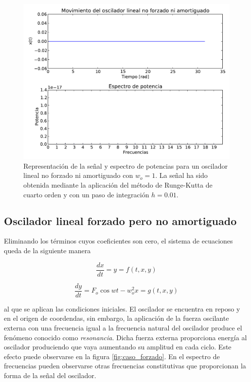 \documentclass[11pt]{article}
\begin{document}
\begin{figure}[h]
\centering
\includegraphics[width=0.75\linewidth]{caso_lineal.pdf}
\caption{Representación de la señal y espectro de potencias para un oscilador lineal no forzado ni amortiguado con $w_o = 1$. La señal ha sido obtenida mediante la aplicación del método de Runge-Kutta de cuarto orden y con un paso de integración $h = 0.01$.}
\label{fig:caso_lineal}
\end{figure}

\subsection{Oscilador lineal forzado pero no amortiguado}
Eliminando los términos cuyos coeficientes son cero, el sistema de ecuaciones queda de la siguiente manera

\begin{equation}
	\frac{dx}{dt} = y = f(t, x, y)
\end{equation}

\begin{equation}
	\frac{dy}{dt} = F_o\cos{wt} - w_o^2 x = g(t, x, y) 	
\end{equation}

al que se aplican las condiciones iniciales. El oscilador se encuentra en reposo y en el origen de coordendas, sin embargo, la aplicación de la fuerza oscilante externa con una frecuencia igual a la frecuencia natural del oscilador produce el fenómeno conocido como \textit{resonancia}. Dicha fuerza externa proporciona energía al oscilador produciendo que vaya aumentando su amplitud en cada ciclo. Este efecto puede observarse en la figura \ref{fig:caso_forzado}. En el espectro de frecuencias pueden observarse otras frecuencias constitutivas que proporcionan la forma de la señal del oscilador.
\end{document}
